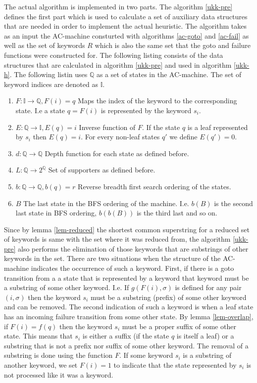 \documentclass[english,twoside,censored,csm,algorithms-track-2020]{HYthesisML}
\theoremstyle{plain}
\theoremstyle{definition}
\begin{document}
The actual algorithm is implemented in two parts. The algorithm \ref{ukk-pre} defines the first part
which is used to calculate a set of auxiliary data structures that are needed in order to implement
the actual heuristic. The algorithm takes as an input the AC-machine consturted with
algorithms \ref{ac-goto} and \ref{ac-fail} as well as the set of keywords $R$ which is also
the same set that the goto and failure functions were constructed for. 
The following listing consists of the data structures that are calculated
in algorithm \ref{ukk-pre} and used in algorithm \ref{ukk-h}. The following listin uses $\mathbb{Q}$ as
a set of states in the AC-machine. The set of keyword indices are denoted as $\mathbb{I}$. 

\begin{enumerate}
  \item $F : \mathbb{I} \rightarrow \mathbb{Q}, F(i)=q$ Maps the index of the keyword to the corresponding state. I.e a state $q=F(i)$ is represented by the keyword $s_i$.
  \item $E : \mathbb{Q} \rightarrow \mathbb{I}, E(q)=i$ Inverse function of $F$. If the state $q$ is a leaf represented by $s_i$ then $E(q)=i$. For every non-leaf states $q'$ we define $E(q')=0$.
  \item $d : \mathbb{Q} \rightarrow \mathbb{Q}$ Depth function for each state as defined before.
  \item $L : \mathbb{Q} \rightarrow 2^{\mathbb{Q}}$ Set of supporters as defined before.
  \item $b : \mathbb{Q} \rightarrow \mathbb{Q}, b(q)=r$ Reverse breadth first search ordering of the states.
  \item $B$ The last state in the BFS ordering of the machine. I.e. $b(B)$ is the second last state in BFS ordering, $b(b(B))$ is the third last and so on.
\end{enumerate}

Since by lemma \ref{lem-reduced} the shortest common superstring for a reduced set of keywords
is same with the set where it was reduced from, the algorithm \ref{ukk-pre} also performs
the elimination of those keywords that are substrings of other keywords in the set. There are two
situations when the structure of the AC-machine indicates the occurrence of such a keyword. First,
if there is a goto transition from a a state that is represented by a keyword that keyword
must be a substring of some other keyword. I.e. If $g(F(i),\sigma)$ is defined for any pair
$(i,\sigma)$ then the keyword $s_i$ must be a substring (prefix)  of some other keyword and can be
removed. The second indication of such a keyword is when a leaf state has an incoming failure
transition from some other state. By lemma \ref{lem-overlap}, if $F(i) = f(q)$ then the keyword
$s_i$ must be a proper suffix of some other state. This means that $s_i$ is either a suffix
(if the state $q$ is itself a leaf) or a substring that is not a prefix nor suffix of some other
keyword. The removal of a substring is done using the function $F$. If some keyword
$s_i$ is a substring of another keyword, we set $F(i)=1$ to indicate that the state represented
by $s_i$ is not processed like it was a keyword.
\end{document}
